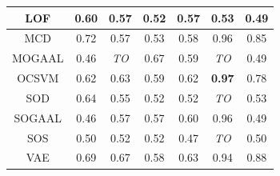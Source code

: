 \begin{table}[!t]
\begin{center}
\begin{small}
\begin{tabular}{|c|c|c|c|c|c|c|}
\hline
LOF &                0.60 &           0.57 &               0.52 &               0.57 &             0.53 &             0.49 \\
\hline
MCD &                0.72 &           0.57 &               0.53 &               0.58 &             0.96 &             0.85 \\
\hline
MOGAAL &                0.46 &    \textit{TO} &               0.67 &               0.59 &      \textit{TO} &             0.49 \\
\hline
OCSVM &                0.62 &           0.63 &               0.59 &               0.62 &    \textbf{0.97} &             0.78 \\
\hline
SOD &                0.64 &           0.55 &               0.52 &               0.52 &      \textit{TO} &             0.53 \\
\hline
SOGAAL &                0.46 &           0.57 &               0.57 &               0.60 &             0.96 &             0.49 \\
\hline
SOS &                0.50 &           0.52 &               0.52 &               0.47 &      \textit{TO} &             0.50 \\
\hline
VAE &                0.69 &           0.67 &               0.58 &               0.63 &             0.94 &             0.88 \\
\hline
\end{tabular}
\end{small}
\end{center}
\vskip -0.1in
\end{table}


